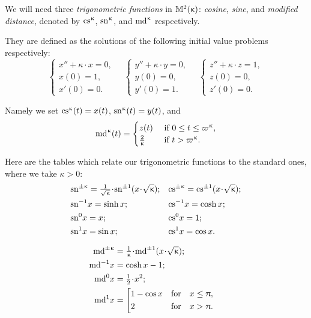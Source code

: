 We will need three \textit{trigonometric functions} in $\mathbb{M}_{{}}^{2}({\upkappa})$: {}\emph{cosine}, {}\emph{sine}, and {}\emph{modified distance}, denoted by $\cs\kappa$, $\sn\kappa$, and $\md\kappa$ respectively. 

They are defined as the solutions of the following initial value problems respectively:
\[
\begin{cases}
 x''+\kappa\cdot x=0,\\
 x(0)=1,\\
 x'(0)=0.
 \end{cases} 
  \quad 
 \begin{cases}
 y''+\kappa\cdot y=0,\\
 y(0)=0,\\
 y'(0)=1.
 \end{cases} 
\quad
 \begin{cases}
 z''+\kappa\cdot z=1,\\
 z(0)=0,\\
 z'(0)=0.
 \end{cases}  
\]

Namely we set $\mathrm{cs}^{\upkappa}(t)=x(t)$, $\mathrm{sn}^{\upkappa}(t)=y(t)$, and 
\[
\md\kappa(t)=
\begin{cases}
z(t)& \textrm{ if } 0\le t\le \varpi\kappa,
\\
\tfrac{2}{\kappa}& \textrm{ if  } t> \varpi\kappa.
\end{cases}
\]

Here are the tables which relate our trigonometric functions to the standard ones, where 
we take $\kappa>0$:\index{$\md\kappa$}\index{$\sn\kappa$}\index{$\cs\kappa$}
\begin{align*}
&\sn{\pm\kappa}=\tfrac{1}{\sqrt{\kappa}}\cdot \sn{\pm1}({x}\cdot {\sqrt{\kappa}});
&&\cs{\pm\kappa}=\cs{\pm1}({x}\cdot {\sqrt{\kappa}});
\\
&\sn{-1} x=\sinh x;&&\cs{-1} x=\cosh x;\\
&\sn{0} x=x;
&&\cs{0} x=1;\\
&\sn{1} x=\sin x;	&&\cs{1} x= \cos x.
\end{align*}
	
\begin{align*}
\md{\pm\kappa}
&=
\tfrac{1}{\kappa}\cdot \md{\pm1}({x}\cdot {\sqrt{\kappa}});
\\
\md{-1} x&=\cosh x-1;
\\
\md{0} x&=\tfrac{1}{2}\cdot x^2; 
\\
\md{1} x
&=
\left[
\begin{aligned}
&1-\cos x&&\text{for}&&x\le \pi,
\\
&2&&\text{for}&&x >\pi.
\end{aligned}
\right.	&
\end{align*}

